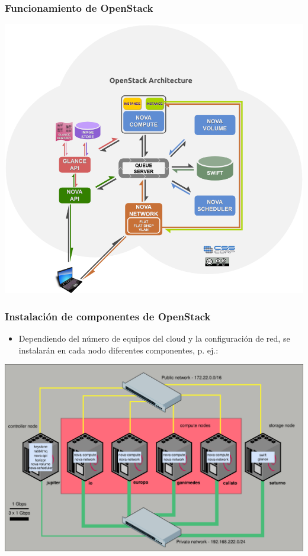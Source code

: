 \documentclass{beamer}
\begin{document}
\begin{frame}
  \frametitle{Funcionamiento de OpenStack}
  \begin{center}
    \includegraphics[height=.75\textheight]{../img/Archhtml.png}
  \end{center}
\end{frame}

\begin{frame}
  \frametitle{Instalación de componentes de OpenStack }
  \begin{itemize}
  \item Dependiendo del número de equipos del cloud y la configuración de red,
    se instalarán en cada nodo diferentes componentes, p. ej.:
  \end{itemize}
  \begin{center}
    \includegraphics[width=.8\textwidth]{../img/esquema_red_iesgn}    
  \end{center}
\end{frame}
\end{document}
